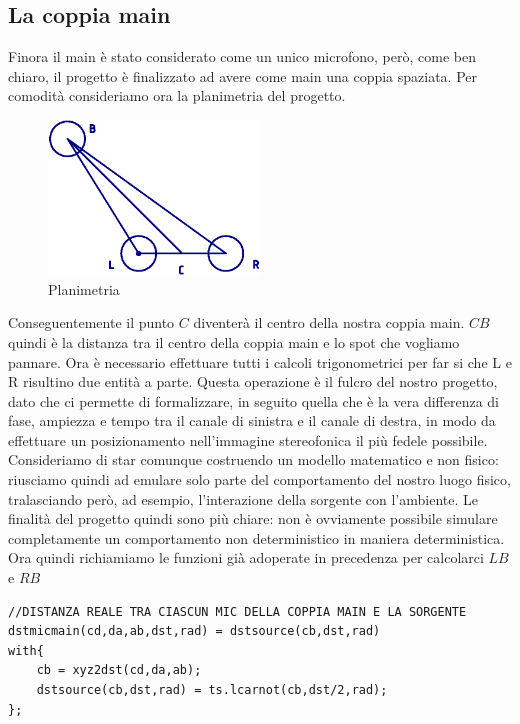 \documentclass{article}
\begin{document}
    \subsection{La coppia main}
    
    Finora il main è stato considerato come un unico microfono, però, come ben chiaro, il progetto è finalizzato ad avere come main una coppia spaziata. Per comodità consideriamo ora la planimetria del progetto.

    \begin{figure}[H]
        \centering
        \includegraphics[width=0.5\textwidth]{images/PLANIMETRIA.png}
         \caption{\label{fig2}Planimetria}
    \end{figure}

    Conseguentemente il punto $C$ diventerà il centro della nostra coppia main. $CB$ quindi è la distanza tra il centro della coppia main e lo spot che vogliamo pannare.
    Ora è necessario effettuare tutti i calcoli trigonometrici per far si che L e R risultino due entità a parte. Questa operazione è il fulcro del nostro progetto, dato che ci permette di formalizzare, in seguito quella che è la vera differenza di fase, ampiezza e tempo tra il canale di sinistra e il canale di destra, in modo da effettuare un posizionamento nell'immagine stereofonica il più fedele possibile. Consideriamo di star comunque costruendo un modello matematico e non fisico: riusciamo quindi ad emulare solo parte del comportamento del nostro luogo fisico, tralasciando però, ad esempio, l'interazione della sorgente con l'ambiente. Le finalità del progetto quindi sono più chiare: non è ovviamente possibile simulare completamente un comportamento non deterministico in maniera deterministica.
    Ora quindi richiamiamo le funzioni già adoperate in precedenza per calcolarci $LB$ e $RB$ \\
    
    \begin{lstlisting}
//DISTANZA REALE TRA CIASCUN MIC DELLA COPPIA MAIN E LA SORGENTE
dstmicmain(cd,da,ab,dst,rad) = dstsource(cb,dst,rad)
with{
    cb = xyz2dst(cd,da,ab);
    dstsource(cb,dst,rad) = ts.lcarnot(cb,dst/2,rad);
};
    \end{lstlisting}
    
\end{document}
